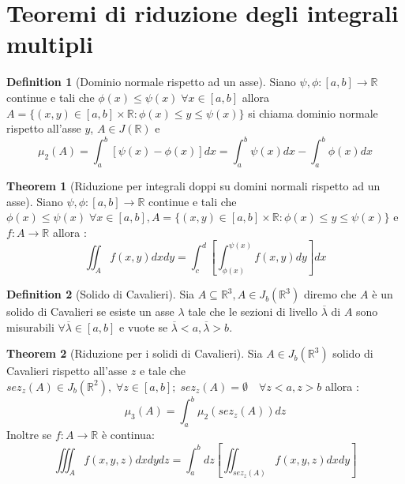 \documentclass[leqno]{article}
\theoremstyle{definition}
\newtheorem{definition}{Definition}[section]
\numberwithin{equation}{section}
\newtheorem{theorem}{Theorem}[section]
\theoremstyle{remark}
\begin{document}
	\section{Teoremi di riduzione degli integrali multipli}
	
	\begin{definition}[Dominio normale rispetto ad un asse]
		Siano $\psi, \phi:[a,b]\to \mathbb{R} $ continue e tali che $\phi(x)\le \psi(x) \; \forall x\in[a,b]$ allora $A=\{(x,y)\in[a,b]\times\mathbb{R} : \phi(x)\le y \le \psi(x)\}$ si chiama dominio normale rispetto all'asse $y$, $A\in J(\mathbb{R})$ e
		\begin{equation}
			\mu_2(A)=\int_a^b[\psi(x)-\phi(x)]dx=\int_a^b\psi(x)dx-\int_a^b\phi(x)dx
		\end{equation}
	\end{definition}
	\begin{theorem}[Riduzione per integrali doppi su domini normali rispetto ad un asse]
		Siano $\psi, \phi:[a,b]\to \mathbb{R} $ continue e tali che $\phi(x)\le \psi(x) \; \forall x\in[a,b], A=\{(x,y)\in[a,b]\times\mathbb{R} : \phi(x)\le y \le \psi(x)\}$ e $f:A\to \mathbb{R}$ allora :
		\begin{equation}
			\iint_Af(x,y)dxdy=\int_c^d\left[\int_{\phi(x)}^{\psi(x)}f(x,y)dy\right]dx
		\end{equation}
	\end{theorem}
	\begin{definition}[Solido di Cavalieri] 
		Sia $A\subseteq \mathbb{R}^3, A\in J_b (\mathbb{R}^3)$ diremo che $A$ è un solido di Cavalieri se esiste un asse $\lambda $ tale che le sezioni di livello $\overline{\lambda}$ di $A$ sono misurabili $\forall \overline{\lambda} \in [a,b]$ e vuote se $\overline{\lambda} < a, \overline{\lambda} > b$.
	\end{definition}
	\begin{theorem}[Riduzione per i solidi di Cavalieri]
		Sia $A\in J_b(\mathbb{R}^3)$ solido di Cavalieri rispetto all'asse $z$ e tale che $sez_z(A)\in J_b(\mathbb{R}^2),\; \forall z\in [a,b]; \; sez_z(A)=\emptyset \quad\forall z< a, z> b$ allora :
		\begin{equation}
			\mu_3(A)=\int_a^b\mu_2(sez_z(A))dz
		\end{equation}
		Inoltre se $f:A\to \mathbb{R}$ è continua: 
		\begin{equation}
			\iiint_Af(x,y,z)dxdydz=\int_a^bdz\left[\iint_{sez_z(A)}f(x,y,z)dxdy\right]
		\end{equation}
	\end{theorem}
\end{document}
